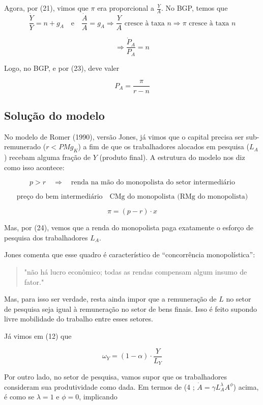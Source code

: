 \documentclass[a4paper,12pt]{article}[abntex2]
\begin{document}
Agora, por (21), vimos que $\pi$ era proporcional a $\frac{Y}{A}$. No BGP, temos que
\[
\frac{\dot{Y}}{Y} = n + g_A \quad \text{e} \quad \frac{\dot{A}}{A} = g_A \Rightarrow \frac{Y}{A} \text{ cresce à taxa } n \Rightarrow \pi \text{ cresce à taxa } n
\]

\[
\Rightarrow \frac{\dot{P}_A}{P_A} = n
\]

Logo, no BGP, e por (23), deve valer

\[
P_A = \frac{\pi}{r - n} \tag{24}
\]

\subsection{\textbf{Solução do modelo}}

No modelo de Romer (1990), versão Jones, já vimos que o capital precisa ser sub-remunerado ($r < PMg_K$) a fim de que os trabalhadores alocados em pesquisa ($L_A$) recebam alguma fração de $Y$ (produto final). A estrutura do modelo nos diz como isso acontece:

\[
p > r \quad \Rightarrow \quad \text{renda na mão do monopolista do setor intermediário}
\]

\[
\text{preço do bem intermediário} \quad \text{CMg do monopolista (RMg do monopolista)}
\]

\[
\pi = (p - r) \cdot x
\]

Mas, por (24), vemos que a renda do monopolista paga exatamente o esforço de pesquisa dos trabalhadores $L_A$.

Jones comenta que esse quadro é característico de ``concorrência monopolística'':
\begin{quote}
"não há lucro econômico; todas as rendas compensam algum insumo de fator."
\end{quote}

Mas, para isso ser verdade, resta ainda impor que a remuneração de $L$ no setor de pesquisa seja igual à remuneração no setor de bens finais. Isso é feito supondo livre mobilidade do trabalho entre esses setores.

Já vimos em (12) que

\[
\omega_Y = (1 - \alpha) \cdot \frac{Y}{L_Y}
\]

\begin{center}
\end{center}

Por outro lado, no setor de pesquisa, vamos supor que os trabalhadores consideram sua produtividade como dada. Em termos de (4  ;  \(\dot{A}=\gamma L_A^\lambda A^\phi\)) acima, é como se $\lambda = 1$ e $\phi = 0$, implicando
\end{document}
